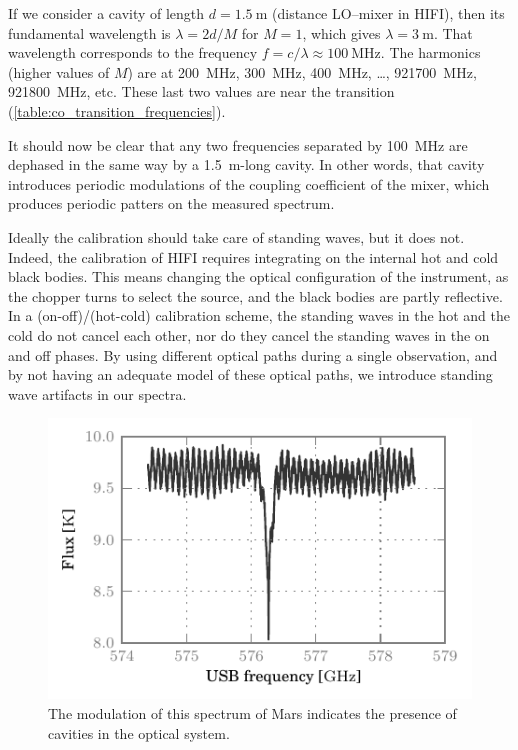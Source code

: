 If we consider a cavity of length $d=\SI{1.5}{\meter}$ (distance LO--mixer in HIFI), then its fundamental wavelength is $\lambda=2d/M$ for $M=1$, which gives $\lambda=\SI{3}{\meter}$.
That wavelength corresponds to the frequency $f=c/\lambda \approx \SI{100}{\mega\hertz}$.
The harmonics (higher values of $M$) are at \SI{200}{\mega\hertz}, \SI{300}{\mega\hertz}, \SI{400}{\mega\hertz}, \ldots, \SI{921700}{\mega\hertz}, \SI{921800}{\mega\hertz}, etc.  These last two values are near the  transition (\cref{table:co_transition_frequencies}).

It should now be clear that any two frequencies separated by \SI{100}{\mega\hertz} are dephased in the same way by a \SI{1.5}{\meter}-long cavity.
In other words, that cavity introduces periodic modulations of the coupling coefficient of the mixer, which produces periodic patters on the measured spectrum.

Ideally the calibration should take care of standing waves, but it does not.
Indeed, the calibration of HIFI requires integrating on the internal hot and cold black bodies.
This means changing the optical configuration of the instrument, as the chopper turns to select the source, and the black bodies are partly reflective.
In a (on-off)/(hot-cold) calibration scheme, the standing waves in the hot and the cold do not cancel each other, nor do they cancel the standing waves in the on and off phases.
By using different optical paths during a single observation, and by not having an adequate model of these optical paths, we introduce standing wave artifacts in our spectra.

\begin{figure}[htbp]
    \centering
    \includegraphics{mars_50010cb7_WBSH_USB}
    \caption{
        The modulation of this spectrum of Mars indicates the presence of cavities in the optical system.
    }
    \label{fig:mars}
\end{figure}

